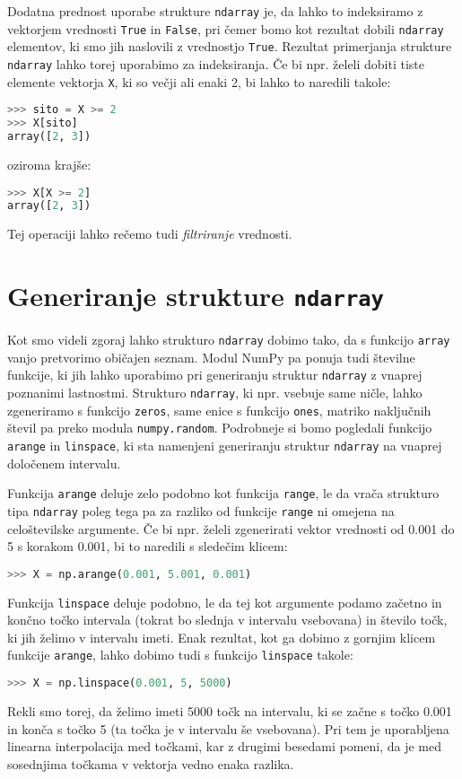 Dodatna prednost uporabe strukture \texttt{ndarray} je, da lahko to indeksiramo z vektorjem vrednosti \texttt{True} in \texttt{False}, pri čemer bomo kot rezultat dobili \texttt{ndarray} elementov, ki smo jih naslovili z vrednostjo \texttt{True}. Rezultat primerjanja strukture \texttt{ndarray} lahko torej uporabimo za indeksiranja. Če bi npr. želeli dobiti tiste elemente vektorja \texttt{X}, ki so večji ali enaki 2, bi lahko to naredili takole:
\begin{lstlisting}[language=Python]
>>> sito = X >= 2
>>> X[sito]
array([2, 3])
\end{lstlisting}
oziroma krajše:
\begin{lstlisting}[language=Python]
>>> X[X >= 2]
array([2, 3])
\end{lstlisting}
Tej operaciji lahko rečemo tudi \emph{filtriranje} vrednosti.

\section{Generiranje strukture \texttt{ndarray}}

Kot smo videli zgoraj lahko strukturo \texttt{ndarray} dobimo tako, da s funkcijo \texttt{array} vanjo pretvorimo običajen seznam. Modul NumPy pa ponuja tudi številne funkcije, ki jih lahko uporabimo pri generiranju  struktur \texttt{ndarray} z vnaprej poznanimi lastnostmi. Strukturo \texttt{ndarray}, ki npr. vsebuje same ničle, lahko zgeneriramo s funkcijo \texttt{zeros}, same enice s funkcijo \texttt{ones}, matriko naključnih števil pa preko modula \texttt{numpy.random}. Podrobneje si bomo pogledali funkcijo \texttt{arange} in \texttt{linspace}, ki sta namenjeni generiranju struktur \texttt{ndarray} na vnaprej določenem intervalu.

Funkcija \texttt{arange} deluje zelo podobno kot funkcija \texttt{range}, le da vrača strukturo tipa \texttt{ndarray} poleg tega pa za razliko od funkcije \texttt{range} ni omejena na celoštevilske argumente. Če bi npr. želeli zgenerirati vektor vrednosti od 0.001 do 5 s korakom 0.001, bi to naredili s sledečim klicem:
\begin{lstlisting}[language=Python]
>>> X = np.arange(0.001, 5.001, 0.001)
\end{lstlisting}
Funkcija \texttt{linspace} deluje podobno, le da tej kot argumente podamo začetno in končno točko intervala (tokrat bo slednja v intervalu vsebovana) in število točk, ki jih želimo v intervalu imeti. Enak rezultat, kot ga dobimo z gornjim klicem funkcije \texttt{arange}, lahko dobimo tudi s funkcijo \texttt{linspace} takole:
\begin{lstlisting}[language=Python]
>>> X = np.linspace(0.001, 5, 5000)
\end{lstlisting}
Rekli smo torej, da želimo imeti 5000 točk na intervalu, ki se začne s točko 0.001 in konča s točko 5 (ta točka je v intervalu še vsebovana). Pri tem je uporabljena linearna interpolacija med točkami, kar z drugimi besedami pomeni, da je med sosednjima točkama v vektorja vedno enaka razlika.

